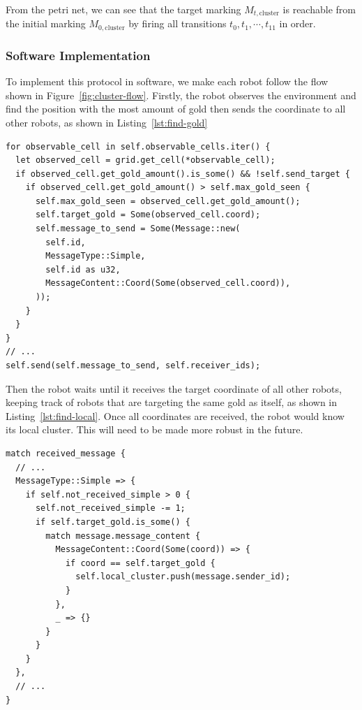 \documentclass[12pt,a4paper]{article}
\begin{document}
From the petri net, we can see that the target marking $M_{t, \text{cluster}}$ is reachable from the initial marking $M_{0, \text{cluster}}$ by firing all transitions $t_0, t_1, \cdots, t_{11}$ in order.

\subsubsection{Software Implementation}
To implement this protocol in software, we make each robot follow the flow shown in Figure~\ref{fig:cluster-flow}. Firstly, the robot observes the environment and find the position with the most amount of gold then sends the coordinate to all other robots, as shown in Listing~\ref{lst:find-gold}
\begin{lstlisting}[float, caption={Robot Observes and Find where the most Gold is}, label={lst:find-gold}]
for observable_cell in self.observable_cells.iter() {
  let observed_cell = grid.get_cell(*observable_cell);
  if observed_cell.get_gold_amount().is_some() && !self.send_target {
    if observed_cell.get_gold_amount() > self.max_gold_seen {
      self.max_gold_seen = observed_cell.get_gold_amount();
      self.target_gold = Some(observed_cell.coord);
      self.message_to_send = Some(Message::new(
        self.id,
        MessageType::Simple,
        self.id as u32,
        MessageContent::Coord(Some(observed_cell.coord)),
      ));
    }
  }
}
// ...
self.send(self.message_to_send, self.receiver_ids);
\end{lstlisting}
Then the robot waits until it receives the target coordinate of all other robots, keeping track of robots that are targeting the same gold as itself, as shown in Listing~\ref{lst:find-local}. Once all coordinates are received, the robot would know its local cluster. This will need to be made more robust in the future.
\begin{lstlisting}[float, caption={Robot Receives Target Gold Coordinates and Keep Track of Local Cluster}, label={lst:find-local}]
match received_message {
  // ...
  MessageType::Simple => {
    if self.not_received_simple > 0 {
      self.not_received_simple -= 1;
      if self.target_gold.is_some() {
        match message.message_content {
          MessageContent::Coord(Some(coord)) => {
            if coord == self.target_gold {
              self.local_cluster.push(message.sender_id);
            }
          },
          _ => {}
        }
      }
    }
  },
  // ...
}

\end{lstlisting}
\end{document}
